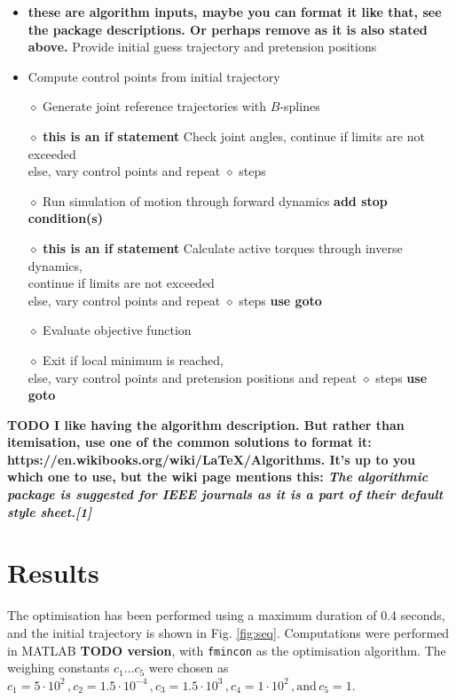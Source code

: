 \documentclass[letterpaper, 10 pt, conference]{ieeeconf}  %
\begin{document}
\begin{itemize}
	\item \textbf{these are algorithm inputs, maybe you can format it like that, see the package descriptions. Or perhaps remove as it is also stated above.} Provide initial guess trajectory and pretension positions
	\item Compute control points from initial trajectory\\
	\item[$\diamond$] Generate joint reference trajectories with $B$-splines
	\item[$\diamond$] \textbf{this is an if statement} Check joint angles, continue if limits are not exceeded \\else, vary control points and repeat $\diamond$ steps
	\item[$\diamond$] Run simulation of motion through forward dynamics \textbf{add stop condition(s)}
	\item[$\diamond$] \textbf{this is an if statement} Calculate active torques through inverse dynamics,\\ continue if limits are not exceeded \\else, vary control points and repeat $\diamond$ steps \textbf{use goto}
	\item[$\diamond$] Evaluate objective function\\
	\item[$\diamond$] Exit if local minimum is reached, \\ else, vary control points and pretension positions and repeat $\diamond$ steps \textbf{use goto}
\end{itemize}

\textbf{TODO I like having the algorithm description. But rather than itemisation, use one of the common solutions to format it: https://en.wikibooks.org/wiki/LaTeX/Algorithms. It's up to you which one to use, but the wiki page mentions this: \textit{The algorithmic package is suggested for IEEE journals as it is a part of their default style sheet.[1]}}


\section{Results} \label{sec:results}
The optimisation has been performed using a maximum duration of 0.4 seconds, and the initial trajectory is shown in Fig. \ref{fig:seq}. Computations were performed in MATLAB \textbf{TODO version}, with \texttt{fmincon} as the optimisation algorithm. The weighing constants $c_1 \dots c_5$ were chosen as $c_1=5 \cdot 10^{2} \,, c_2=1.5 \cdot 10^{-4} \,, c_3=1.5 \cdot 10^{3} \,, c_4 = 1\cdot 10^{2} \,, \text{and} \, c_5 = 1$.
\end{document}
